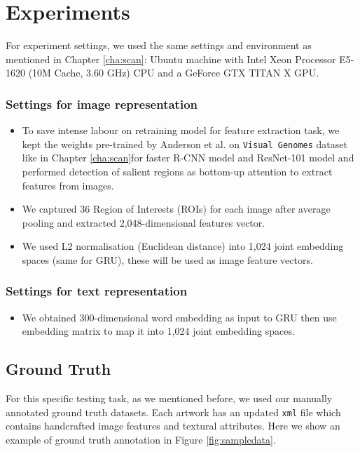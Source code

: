 \section{Experiments}

For experiment settings, we used the same settings and environment as mentioned in Chapter \ref{cha:scan}: Ubuntu machine with Intel Xeon Processor E5-1620 (10M Cache, 3.60 GHz) CPU and a GeForce GTX TITAN X GPU. 

\subsubsection{Settings for image representation}

\begin{itemize}
    \item To save intense labour on retraining model for feature extraction task, we kept the weights pre-trained by Anderson et al. on \verb|Visual Genomes| dataset like in Chapter \ref{cha:scan}for faster R-CNN model and ResNet-101 model and performed detection of salient regions as bottom-up attention to extract features from images. 
    \item We captured 36 Region of Interests (ROIs) for each image after average pooling and extracted 2,048-dimensional features vector.
    \item We used L2 normalisation (Euclidean distance) into 1,024 joint embedding spaces (same for GRU), these will be used as image feature vectors.
\end{itemize}

\subsubsection{Settings for text representation}

\begin{itemize}
    \item We obtained 300-dimensional word embedding as input to GRU then use embedding matrix to map it into 1,024 joint embedding spaces.
\end{itemize}

\subsection{Ground Truth}

For this specific testing task, as we mentioned before, we used our manually annotated ground truth datasets. Each artwork has an updated \verb|xml| file which contains handcrafted image features and textural attributes. Here we show an example of ground truth annotation in Figure \ref{fig:sampledata}.

